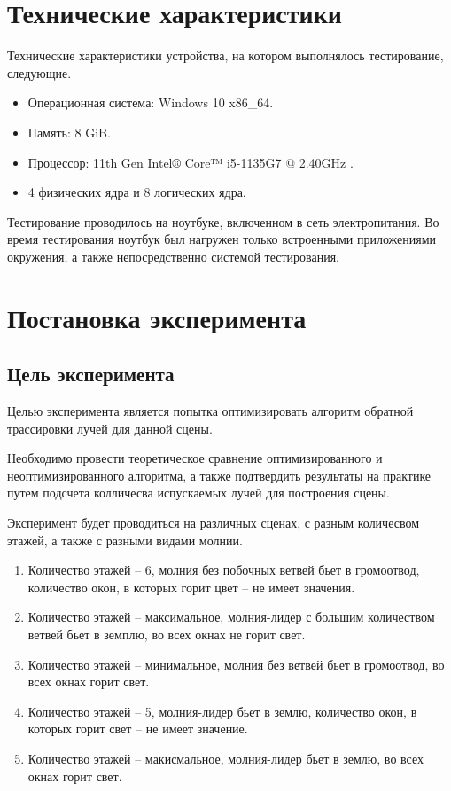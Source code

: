 \section{Технические характеристики}

Технические характеристики устройства, на котором выполнялось тестирование, следующие.

\begin{itemize}
	\item Операционная система: Windows 10 \cite{oswind} x86\_64.
	\item Память: 8 GiB.
	\item Процессор: 11th Gen Intel® Core™ i5-1135G7 @ 2.40GHz \cite{intel}.
	\item 4 физических ядра и 8 логических ядра.
\end{itemize}

Тестирование проводилось на ноутбуке, включенном в сеть электропитания. Во время тестирования ноутбук был нагружен только встроенными приложениями окружения, а также непосредственно системой тестирования.


\section{Постановка эксперимента} 

\subsection{Цель эксперимента}


Целью эксперимента является попытка оптимизировать алгоритм обратной трассировки лучей для данной сцены. 

Необходимо провести теоретическое сравнение оптимизированного и неоптимизированного алгоритма, а также подтвердить результаты на практике путем подсчета колличесва испускаемых лучей для построения сцены.

Эксперимент будет проводиться на различных сценах, с разным количесвом этажей, а также с разными видами молнии.
\begin{enumerate}
	\item Количество этажей -- 6, молния без побочных ветвей бьет в громоотвод, количество окон, в которых горит цвет -- не имеет значения.
	\item Количество этажей -- максимальное, молния-лидер с большим количеством ветвей бьет в земплю, во всех окнах не горит свет.
	\item Количество этажей -- минимальное, молния без ветвей бьет в громоотвод, во всех окнах горит свет. 
	\item Количество этажей -- 5, молния-лидер бьет в землю, количество окон, в которых горит свет -- не имеет значение.
	\item Количество этажей -- макисмальное, молния-лидер бьет в землю, во всех окнах горит свет.
\end{enumerate}

